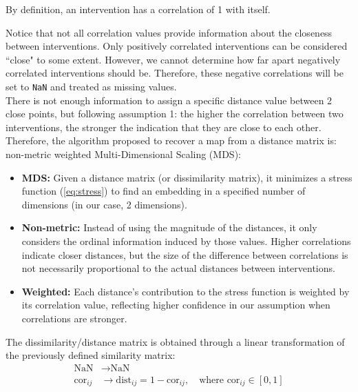 \begin{remark}
    By definition, an intervention has a correlation of 1 with itself.
\end{remark}

Notice that not all correlation values provide information about the closeness between interventions. Only positively correlated interventions can be considered ``close" to some extent. However, we cannot determine how far apart negatively correlated interventions should be. Therefore, these negative correlations will be set to \texttt{NaN} and treated as missing values.\\

There is not enough information to assign a specific distance value between 2 close points, but following assumption 1: the higher the correlation between two interventions, the stronger the indication that they are close to each other. Therefore, the algorithm proposed to recover a map from a distance matrix is: non-metric weighted Multi-Dimensional Scaling (MDS):

\begin{itemize}
    \item \textbf{MDS:} Given a distance matrix (or dissimilarity matrix), it minimizes a stress function (\ref{eq:stress}) to find an embedding in a specified number of dimensions (in our case, 2 dimensions).
    \item \textbf{Non-metric:} Instead of using the magnitude of the distances, it only considers the ordinal information induced by those values. Higher correlations indicate closer distances, but the size of the difference between correlations is not necessarily proportional to the actual distances between interventions.
    \item \textbf{Weighted:} Each distance's contribution to the stress function is weighted by its correlation value, reflecting higher confidence in our assumption when correlations are stronger.
\end{itemize}

\begin{remark}
    The dissimilarity/distance matrix is obtained through a linear transformation of the previously defined similarity matrix:
    \begin{align*}
        \text{NaN} &\rightarrow \text{NaN} \\
        \text{cor}_{ij} &\rightarrow \text{dist}_{ij} = 1-\text{cor}_{ij}, \quad \text{where } \text{cor}_{ij} \in [0,1]
    \end{align*}
\end{remark}


